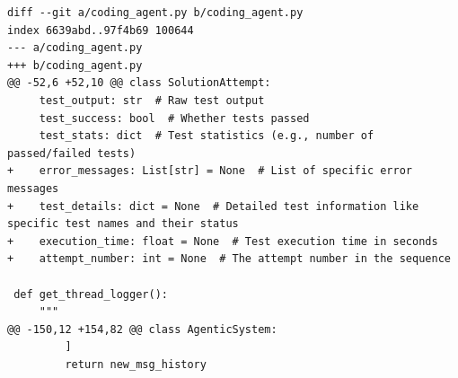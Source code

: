 \documentclass{article}
\begin{document}
\begin{lstlisting}[style=diffstyle]
diff --git a/coding_agent.py b/coding_agent.py
index 6639abd..97f4b69 100644
--- a/coding_agent.py
+++ b/coding_agent.py
@@ -52,6 +52,10 @@ class SolutionAttempt:
     test_output: str  # Raw test output
     test_success: bool  # Whether tests passed
     test_stats: dict  # Test statistics (e.g., number of passed/failed tests)
+    error_messages: List[str] = None  # List of specific error messages
+    test_details: dict = None  # Detailed test information like specific test names and their status
+    execution_time: float = None  # Test execution time in seconds
+    attempt_number: int = None  # The attempt number in the sequence
 
 def get_thread_logger():
     """
@@ -150,12 +154,82 @@ class AgenticSystem:
         ]
         return new_msg_history
 

\end{lstlisting}
\end{document}
